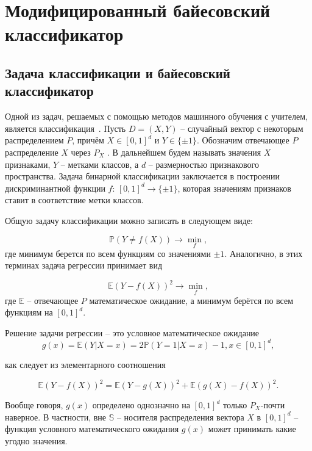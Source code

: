 \section{Модифицированный байесовский классификатор}\label{sec:ch1/modified_bayesian_classifier}

\subsection{Задача классификации и байесовский классификатор}\label{subsec:ch1/classification_task}

Одной из задач, решаемых с помощью методов машинного обучения с учителем, является классификация~\cite{vorontsov2008lections}. Пусть \(D = (X, Y)\) -- случайный вектор с некоторым распределением \(P\), причём \(X \in [0, 1]^d\) и \(Y \in \{\pm 1\}\). Обозначим отвечающее \(P\) распределение \(X\) через \(P_X\) . В дальнейшем будем называть значения \(X\) признаками, \(Y\) -- метками классов, а \(d\) -- размерностью признакового пространства. Задача бинарной классификации заключается в построении дискриминантной функции \(f\): \([0, 1]^d \rightarrow \{\pm 1\}\), которая значениям признаков ставит в соответствие метки классов.

Общую задачу классификации можно записать в следующем виде:

\begin{equation}
    \label{eq:binary_classification}
    \mathbb{P}(Y \neq f(X)) \rightarrow \min\limits_{f},
\end{equation}
где минимум берется по всем функциям со значениями \(\pm 1\). Аналогично, в этих терминах задача регрессии принимает вид

\begin{equation}
    \label{eq:binary_regression}
    \mathbb{E}\left(Y - f(X)\right)^2 \rightarrow \min\limits_{f},
\end{equation}
где \(\mathbb{E}\) – отвечающее \(P\) математическое ожидание, а минимум берётся по всем функциям на \([0, 1]^d\).

Решение задачи регрессии – это условное математическое ожидание
\[
    g(x) = \mathbb{E}\left(Y|X=x\right) = 2\mathbb{P}(Y=1|X=x) - 1, x \in [0, 1]^d,
\]

как следует из элементарного соотношения

\[
    \mathbb{E}\left(Y-f(X)\right)^2 = \mathbb{E}\left(Y-g(X)\right)^2 + \mathbb{E}\left(g(X)-f(X)\right)^2.
\]

Вообще говоря, \(g(x)\) определено однозначно на \([0, 1]^d\) только \(P_X\)-почти наверное. В частности, вне \(\mathbb{S}\) – носителя распределения вектора \(X\) в \([0, 1]^d\) – функция условного математического ожидания \(g(x)\) может принимать какие угодно значения.

